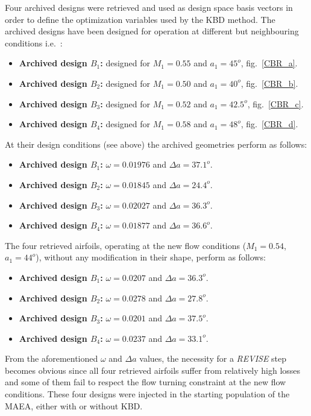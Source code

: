 Four archived designs were retrieved and used as design space basis vectors in order to define the optimization variables used by the KBD method. 
The archived designs have been designed for operation at different but neighbouring conditions i.e.\ :
\pagebreak
\begin{itemize}
\item{\textbf{Archived design $B_1$:}} designed for $M_1=0.55$ and $a_1=45^o$, fig.\ \ref{CBR_a}.
\item{\textbf{Archived design $B_2$:}} designed for $M_1=0.50$ and $a_1=40^o$, fig.\ \ref{CBR_b}.
\item{\textbf{Archived design $B_3$:}} designed for $M_1=0.52$ and $a_1=42.5^o$, fig.\ \ref{CBR_c}. 
\item{\textbf{Archived design $B_4$:}} designed for $M_1=0.58$ and $a_1=48^o$, fig.\ \ref{CBR_d}.
\end{itemize}
At their design conditions (see above) the archived geometries perform as follows: 
\begin{itemize}
\item{\textbf{Archived design $B_1$:}} $\omega=0.01976$ and $\Delta a=37.1^o$.
\item{\textbf{Archived design $B_2$:}} $\omega=0.01845$ and $\Delta a=24.4^o$.
\item{\textbf{Archived design $B_3$:}} $\omega=0.02027$ and $\Delta a=36.3^o$.
\item{\textbf{Archived design $B_4$:}} $\omega=0.01877$ and $\Delta a=36.6^o$.
\end{itemize}
The four retrieved airfoils, operating at the new flow conditions ($M_1=0.54$, $a_1=44^o$), without any modification in their shape, perform as follows:
\begin{itemize}
\item{\textbf{Archived design $B_1$:}} $\omega=0.0207$ and $\Delta a=36.3^o$.
\item{\textbf{Archived design $B_2$:}} $\omega=0.0278$ and $\Delta a=27.8^o$.
\item{\textbf{Archived design $B_3$:}} $\omega=0.0201$ and $\Delta a=37.5^o$.
\item{\textbf{Archived design $B_4$:}} $\omega=0.0237$ and $\Delta a=33.1^o$.
\end{itemize}
From the aforementioned $\omega$ and $\Delta a$ values, the necessity for a \textit{REVISE} step becomes obvious since all four retrieved airfoils suffer from relatively high losses and some of them fail to respect the flow turning constraint at the new flow conditions. These four designs were injected in the starting population of the MAEA, either with or without KBD.  

